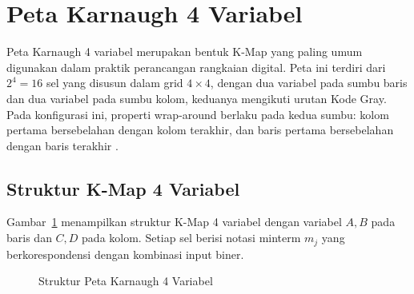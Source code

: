 \section{Peta Karnaugh 4 Variabel}

Peta Karnaugh 4 variabel merupakan bentuk K-Map yang paling umum digunakan dalam praktik perancangan rangkaian digital. Peta ini terdiri dari $2^4 = 16$ sel yang disusun dalam grid $4 \times 4$, dengan dua variabel pada sumbu baris dan dua variabel pada sumbu kolom, keduanya mengikuti urutan Kode Gray. Pada konfigurasi ini, properti wrap-around berlaku pada kedua sumbu: kolom pertama bersebelahan dengan kolom terakhir, dan baris pertama bersebelahan dengan baris terakhir \cite{rosen2019}.

\subsection{Struktur K-Map 4 Variabel}

Gambar~\ref{fig:kmap-4var} menampilkan struktur K-Map 4 variabel dengan variabel $A, B$ pada baris dan $C, D$ pada kolom. Setiap sel berisi notasi minterm $m_j$ yang berkorespondensi dengan kombinasi input biner.

\begin{figure}[htbp]
\centering
{}
\caption{Struktur Peta Karnaugh 4 Variabel}
\label{fig:kmap-4var}
\end{figure}

